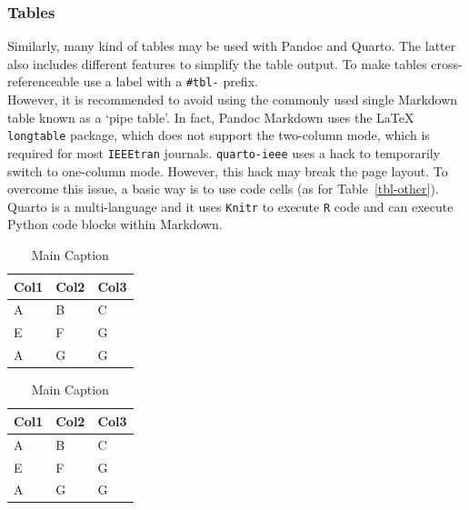 \documentclass[
  journal,
]{IEEEtran}%
\theoremstyle{plain}
\theoremstyle{remark}
\begin{document}
\hypertarget{sec-tables}{%
\subsubsection{Tables}\label{sec-tables}}

Similarly, many kind of tables may be used with Pandoc and Quarto. The
latter also includes different features to simplify the table output. To
make tables cross-referenceable use a label with a \texttt{\#tbl-}
prefix.\\
However, it is recommended to avoid using the commonly used single
Markdown table known as a `pipe table'. In fact, Pandoc Markdown uses
the {\LaTeX} \texttt{longtable} package, which does not support the
two-column mode, which is required for most \texttt{IEEEtran} journals.
\texttt{quarto-ieee} uses a hack to temporarily switch to one-column
mode. However, this hack may break the page layout. To overcome this
issue, a basic way is to use code cells (as for Table~\ref{tbl-other}).
Quarto is a multi-language and it uses \texttt{Knitr} to execute
\texttt{R} code and can execute Python code blocks within Markdown.

\begin{table}

\caption{\label{tbl-panel}Main
Caption}\begin{minipage}[t]{0.50\linewidth}

{\centering 

\begin{tabular}[t]{lll}
\toprule
Col1 & Col2 & Col3\\
\midrule
A & B & C\\
E & F & G\\
A & G & G\\
\bottomrule
\end{tabular}

}

\end{minipage}%
%
\begin{minipage}[t]{0.50\linewidth}

{\centering 

\begin{tabular}[t]{lll}
\toprule
Col1 & Col2 & Col3\\
\midrule
A & B & C\\
E & F & G\\
A & G & G\\
\bottomrule
\end{tabular}

}

\end{minipage}%

\end{table}
\end{document}
